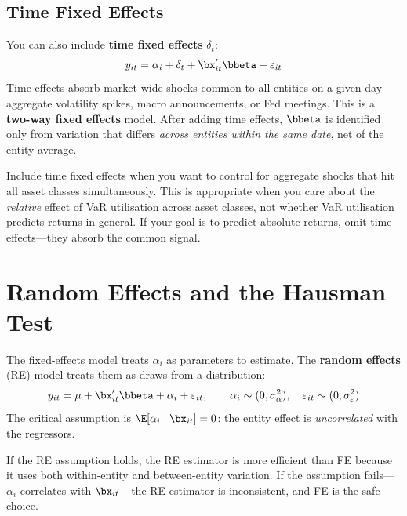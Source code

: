 \subsection{Time Fixed Effects}

You can also include \textbf{time fixed effects} $\delta_t$:
\begin{equation}
  y_{it} = \alpha_i + \delta_t + \bx_{it}'\bbeta + \varepsilon_{it}
  \label{eq:twoway-fe}
\end{equation}
Time effects absorb market-wide shocks common to all entities on a given day---aggregate volatility spikes, macro announcements, or Fed meetings.
This is a \textbf{two-way fixed effects} model.
After adding time effects, $\bbeta$ is identified only from variation that differs \emph{across entities within the same date}, net of the entity average.

\begin{prereq}
Include time fixed effects when you want to control for aggregate shocks that hit all asset classes simultaneously.
This is appropriate when you care about the \emph{relative} effect of VaR utilisation across asset classes, not whether VaR utilisation predicts returns in general.
If your goal is to predict absolute returns, omit time effects---they absorb the common signal.
\end{prereq}

\section{Random Effects and the Hausman Test}
\label{sec:panel-re}

The fixed-effects model treats $\alpha_i$ as parameters to estimate.
The \textbf{random effects} (RE) model treats them as draws from a distribution:
\begin{equation}
  y_{it} = \mu + \bx_{it}'\bbeta + \alpha_i + \varepsilon_{it}, \qquad
  \alpha_i \sim (0, \sigma_\alpha^2), \quad
  \varepsilon_{it} \sim (0, \sigma_\varepsilon^2)
  \label{eq:re-model}
\end{equation}
The critical assumption is $\E[\alpha_i \mid \bx_{it}] = 0$: the entity effect is \emph{uncorrelated} with the regressors.

If the RE assumption holds, the RE estimator is more efficient than FE because it uses both within-entity and between-entity variation.
If the assumption fails---$\alpha_i$ correlates with $\bx_{it}$---the RE estimator is inconsistent, and FE is the safe choice.

